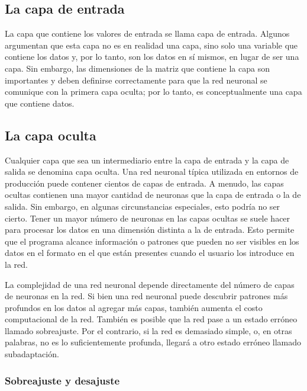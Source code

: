 \subsection{La capa de entrada}

La capa que contiene los valores de entrada se llama capa de entrada. Algunos argumentan que esta capa no es en realidad una capa, sino solo una variable que contiene los datos y, por lo tanto, son los datos en sí mismos, en lugar de ser una capa. Sin embargo, las dimensiones de la matriz que contiene la capa son importantes y deben definirse correctamente para que la red neuronal se comunique con la primera capa oculta; por lo tanto, es conceptualmente una capa que contiene datos.

\subsection{La capa oculta}


Cualquier capa que sea un intermediario entre la capa de entrada y la capa de salida se denomina capa oculta. Una red neuronal típica utilizada en entornos de producción puede contener cientos de capas de entrada. A menudo, las capas ocultas contienen una mayor cantidad de neuronas que la capa de entrada o la de salida. Sin embargo, en algunas circunstancias especiales, esto podría no ser cierto. Tener un mayor número de neuronas en las capas ocultas se suele hacer para procesar los datos en una dimensión distinta a la de entrada. Esto permite que el programa alcance información o patrones que pueden no ser visibles en los datos en el formato en el que están presentes cuando el usuario los introduce en la red.

La complejidad de una red neuronal depende directamente del número de capas de neuronas en la red. Si bien una red neuronal puede descubrir patrones más profundos en los datos al agregar más capas, también aumenta el costo computacional de la red. También es posible que la red pase a un estado erróneo llamado sobreajuste. Por el contrario, si la red es demasiado simple, o, en otras palabras, no es lo suficientemente profunda, llegará a otro estado erróneo llamado subadaptación.

\subsubsection{Sobreajuste y desajuste}

